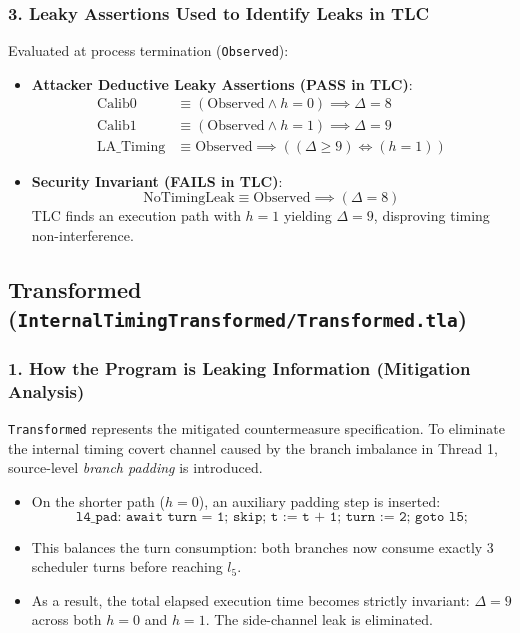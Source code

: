 \documentclass[a4paper,11pt]{article}
\begin{document}
\subsubsection{3. Leaky Assertions Used to Identify Leaks in TLC}
Evaluated at process termination (\texttt{Observed}):
\begin{itemize}
    \item \textbf{Attacker Deductive Leaky Assertions (PASS in TLC)}:
    \begin{align*}
        \text{Calib0} &\equiv (\text{Observed} \land h = 0) \implies \Delta = 8\\
        \text{Calib1} &\equiv (\text{Observed} \land h = 1) \implies \Delta = 9\\
        \text{LA\_Timing} &\equiv \text{Observed} \implies ((\Delta \ge 9) \iff (h = 1))
    \end{align*}
    \item \textbf{Security Invariant (FAILS in TLC)}:
    $$\text{NoTimingLeak} \equiv \text{Observed} \implies (\Delta = 8)$$
    TLC finds an execution path with $h = 1$ yielding $\Delta = 9$, disproving timing non-interference.
\end{itemize}

\bigskip

\subsection{Transformed (\texttt{InternalTimingTransformed/Transformed.tla})}

\subsubsection{1. How the Program is Leaking Information (Mitigation Analysis)}
\texttt{Transformed} represents the mitigated countermeasure specification. To eliminate the internal timing covert channel caused by the branch imbalance in Thread 1, source-level \emph{branch padding} is introduced.
\begin{itemize}
    \item On the shorter path ($h = 0$), an auxiliary padding step is inserted:
    $$\texttt{l4\_pad: await turn = 1; skip; t := t + 1; turn := 2; goto l5;}$$
    \item This balances the turn consumption: both branches now consume exactly 3 scheduler turns before reaching $l_5$.
    \item As a result, the total elapsed execution time becomes strictly invariant: $\Delta = 9$ across both $h = 0$ and $h = 1$. The side-channel leak is eliminated.
\end{itemize}
\end{document}
